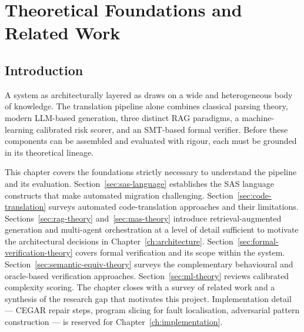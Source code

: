 
\chapter{Theoretical Foundations and Related Work}
\label{ch:foundations}

\section{Introduction}
\label{sec:ch2-intro}

A system as architecturally layered as \codara{} draws on a wide and
heterogeneous body of knowledge. The translation pipeline alone combines
classical parsing theory, modern \ac{LLM}-based generation, three distinct
\ac{RAG} paradigms, a machine-learning calibrated risk scorer, and an
\ac{SMT}-based formal verifier. Before these components can be assembled and
evaluated with rigour, each must be grounded in its theoretical lineage.

This chapter covers the foundations strictly necessary to understand the
pipeline and its evaluation. Section~\ref{sec:sas-language} establishes the
SAS language constructs that make automated migration challenging.
Section~\ref{sec:code-translation} surveys automated code-translation
approaches and their limitations. Sections~\ref{sec:rag-theory}
and~\ref{sec:mas-theory} introduce retrieval-augmented generation and
multi-agent orchestration at a level of detail sufficient to motivate the
architectural decisions in Chapter~\ref{ch:architecture}.
Section~\ref{sec:formal-verification-theory} covers formal verification and
its scope within the system. Section~\ref{sec:semantic-equiv-theory}
surveys the complementary behavioural and oracle-based verification approaches.
Section~\ref{sec:ml-theory} reviews calibrated complexity scoring. The chapter
closes with a survey of related work and a synthesis of the research gap that
motivates this project. Implementation detail --- CEGAR repair steps, program
slicing for fault localisation, adversarial pattern construction --- is
reserved for Chapter~\ref{ch:implementation}.

